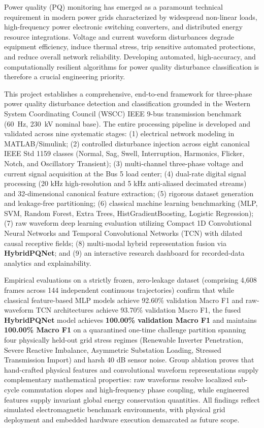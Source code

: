 \documentclass[12pt,a4paper]{report}
\begin{document}
\justify
Power quality (PQ) monitoring has emerged as a paramount technical requirement in modern power grids characterized by widespread non-linear loads, high-frequency power electronic switching converters, and distributed energy resource integrations. Voltage and current waveform disturbances degrade equipment efficiency, induce thermal stress, trip sensitive automated protections, and reduce overall network reliability. Developing automated, high-accuracy, and computationally resilient algorithms for power quality disturbance classification is therefore a crucial engineering priority.

This project establishes a comprehensive, end-to-end framework for three-phase power quality disturbance detection and classification grounded in the Western System Coordinating Council (WSCC) IEEE 9-bus transmission benchmark (60~Hz, 230~kV nominal base). The entire processing pipeline is developed and validated across nine systematic stages:
(1) electrical network modeling in MATLAB/Simulink;
(2) controlled disturbance injection across eight canonical IEEE Std 1159 classes (Normal, Sag, Swell, Interruption, Harmonics, Flicker, Notch, and Oscillatory Transient);
(3) multi-channel three-phase voltage and current signal acquisition at the Bus 5 load center;
(4) dual-rate digital signal processing (20 kHz high-resolution and 5 kHz anti-aliased decimated streams) and 32-dimensional canonical feature extraction;
(5) rigorous dataset generation and leakage-free partitioning;
(6) classical machine learning benchmarking (MLP, SVM, Random Forest, Extra Trees, HistGradientBoosting, Logistic Regression);
(7) raw waveform deep learning evaluation utilizing Compact 1D Convolutional Neural Networks and Temporal Convolutional Networks (TCN) with dilated causal receptive fields;
(8) multi-modal hybrid representation fusion via \textbf{HybridPQNet}; and
(9) an interactive research dashboard for recorded-data analytics and explainability.

Empirical evaluations on a strictly frozen, zero-leakage dataset (comprising 4,608 frames across 144 independent continuous trajectories) confirm that while classical feature-based MLP models achieve 92.60\% validation Macro F1 and raw-waveform TCN architectures achieve 93.70\% validation Macro F1, the fused \textbf{HybridPQNet} model achieves \textbf{100.00\% validation Macro F1} and maintains \textbf{100.00\% Macro F1} on a quarantined one-time challenge partition spanning four physically held-out grid stress regimes (Renewable Inverter Penetration, Severe Reactive Imbalance, Asymmetric Substation Loading, Stressed Transmission Import) and harsh 40 dB sensor noise. Group ablation proves that hand-crafted physical features and convolutional waveform representations supply complementary mathematical properties: raw waveforms resolve localized sub-cycle commutation slopes and high-frequency phase coupling, while engineered features supply invariant global energy conservation quantities. All findings reflect simulated electromagnetic benchmark environments, with physical grid deployment and embedded hardware execution demarcated as future scope.
\end{document}
